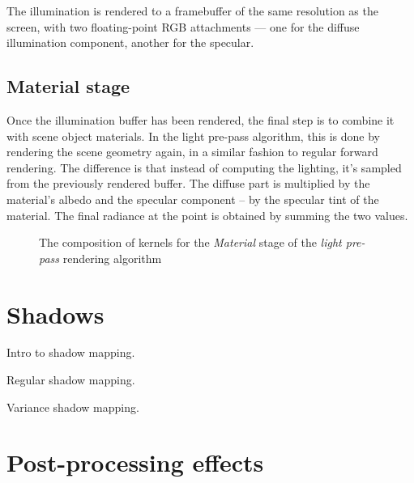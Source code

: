The illumination is rendered to a framebuffer of the same resolution as the screen, with two floating-point RGB attachments --- one for the diffuse illumination component, another for the specular.

\subsection{Material stage}

Once the illumination buffer has been rendered, the final step is to combine it with scene object materials. In the light pre-pass algorithm, this is done by rendering the scene geometry again, in a similar fashion to regular forward rendering. The difference is that instead of computing the lighting, it's sampled from the previously rendered buffer. The diffuse part is multiplied by the material's albedo and the specular component -- by the specular tint of the material. The final radiance at the point is obtained by summing the two values.

\begin{figure}[h!]
  \centering
    \caption[Light Pre-Pass Stage 3]{The composition of kernels for the \emph{Material} stage of the  \emph{light pre-pass} rendering algorithm}
  \label{fig:DeferredLightingStage3}
\end{figure}

\clearpage
\section{Shadows}

Intro to shadow mapping.

Regular shadow mapping.

Variance shadow mapping.

\clearpage
\section{Post-processing effects}
